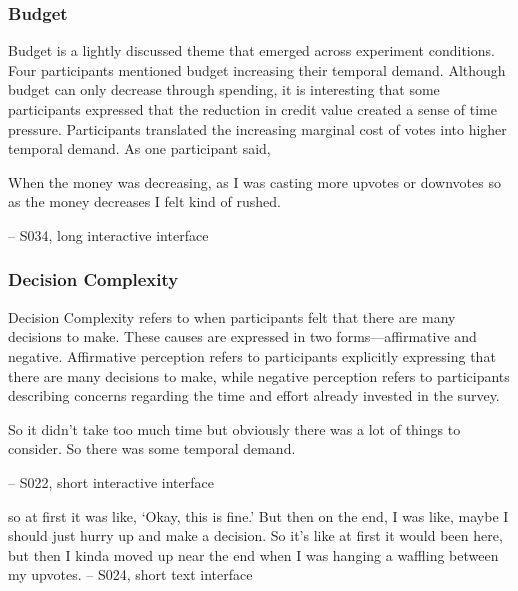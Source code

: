 \subsubsection{Budget}
Budget is a lightly discussed theme that emerged across experiment conditions. Four participants mentioned budget increasing their temporal demand. Although budget can only decrease through spending, it is interesting that some participants expressed that the reduction in credit value created a sense of time pressure. Participants translated the increasing marginal cost of votes into higher temporal demand. As one participant said,

\begin{displayquote}
When the money was decreasing, as I was casting more upvotes or downvotes so as the money decreases I felt kind of rushed.
            
\noindent \hfill -- S034, long interactive interface
\end{displayquote}

\subsubsection{Decision Complexity} Decision Complexity refers to when participants felt that there are many decisions to make. These causes are expressed in two forms—affirmative and negative. Affirmative perception refers to participants explicitly expressing that there are many decisions to make, while negative perception refers to participants describing concerns regarding the time and effort already invested in the survey.

\begin{displayquote}
So it didn't take too much time but obviously there was a lot of things to consider. So there was some temporal demand.
    
\noindent \hfill -- S022, short interactive interface
\end{displayquote}

\begin{displayquote}
\bracketellipsis so at first it was like, `Okay, this is fine.' But then on the end, I was like, maybe I should just hurry up and make a decision. So it's like at first it would been here, but then I kinda moved up near the end when I was hanging a waffling between my upvotes.
\noindent \hfill -- S024, short text interface
\end{displayquote}

